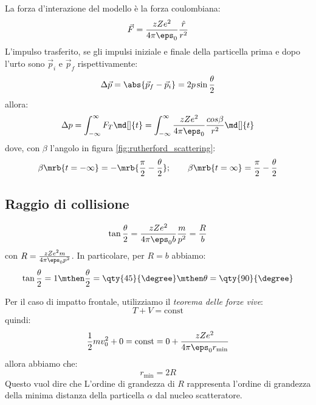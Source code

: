 La forza d'interazione del modello è la forza coulombiana:
\begin{equation}
  \vec{F} = \frac{z Z e^2}{4 \pi \eps_0} \frac{\hat{r}}{r^2}
\end{equation}
L'impulso trasferito, se gli impulsi iniziale e finale della particella prima e
dopo l'urto sono $\vec{p}_{i}$ e $\vec{p}_{f}$ rispettivamente:
\begin{equation}
  \Delta \vec{p} = \abs{\vec{p}_{f} - \vec{p}_{i}} = 2 p \sin \frac{\theta}{2}
\end{equation}
allora:
\begin{equation}
  \Delta p = \int_{-\infty}^{\infty} F_T \md[]{t}
  = \int_{-\infty}^{\infty} \frac{z Z e^2}{4 \pi \eps_0} \frac{cos \beta}{r^2} \md[]{t}
\end{equation}
dove, con $\beta$ l'angolo in figura \ref{fig:rutherford_scattering}:
\begin{equation}
  \beta \mrb{t = - \infty} = - \mrb{\frac{\pi}{2} - \frac{\theta}{2}};
  \qquad
  \beta \mrb{t = \infty} = \frac{\pi}{2} - \frac{\theta}{2}
\end{equation}

\subsection{Raggio di collisione}
\begin{equation}
  \tan \frac{\theta}{2}
  = \frac{z Z e^2}{4 \pi \eps_0 b} \frac{m}{p^2}
  = \frac{R}{b}
\end{equation}
con $R = \frac{z Z e^2 m}{4 \pi \eps_0 p^2}$.
In particolare, per $R = b$ abbiamo:
\begin{equation}
  \tan \frac{\theta}{2} = 1
  \mthen
  \frac{\theta}{2} = \qty{45}{\degree}
  \mthen \theta = \qty{90}{\degree}
\end{equation}

Per il caso di impatto frontale, utilizziamo il \textit{teorema delle forze
vive}:
\begin{equation}
  T + V = \text{const}
\end{equation}
quindi:
\begin{equation}
  \frac{1}{2} m v_0^2 + 0
  = \text{const}
  = 0 + \frac{z Z e^2}{4 \pi \eps_0 r_{\text{min}}}
\end{equation}
allora abbiamo che:
\begin{equation}
  r_{\text{min}} = 2 R
\end{equation}
Questo vuol dire che L'ordine di grandezza di $R$ rappresenta l'ordine di
grandezza della minima distanza della particella $\alpha$ dal nucleo
scatteratore.
